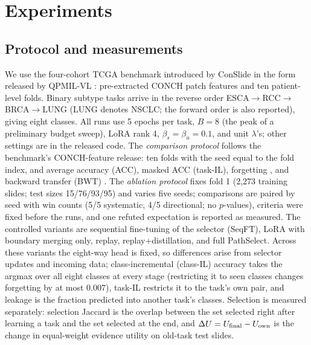 \documentclass{article}
\begin{document}
\section{Experiments}
\label{sec:exp}

\subsection{Protocol and measurements}

We use the four-cohort TCGA benchmark introduced by ConSlide \cite{huang2023conslide} in the form released by QPMIL-VL \cite{gou2025qpmil}: pre-extracted CONCH patch features and ten patient-level folds. Binary subtype tasks arrive in the reverse order ESCA$\rightarrow$RCC$\rightarrow$BRCA$\rightarrow$LUNG (LUNG denotes NSCLC; the forward order is also reported), giving eight classes. All runs use 5 epochs per task, $B=8$ (the peak of a preliminary budget sweep), LoRA rank 4, $\beta_s{=}\beta_u{=}0.1$, and unit $\lambda$'s; other settings are in the released code. The \emph{comparison protocol} follows the benchmark's CONCH-feature release: ten folds with the seed equal to the fold index, and average accuracy (ACC), masked ACC (task-IL), forgetting \cite{chaudhry2018rwalk}, and backward transfer (BWT) \cite{lopezpaz2017gem}. The \emph{ablation protocol} fixes fold 1 (2,273 training slides; test sizes 15/76/93/95) and varies five seeds; comparisons are paired by seed with win counts (5/5 systematic, 4/5 directional; no $p$-values), criteria were fixed before the runs, and one refuted expectation is reported as measured. The controlled variants are sequential fine-tuning of the selector (SeqFT), LoRA with boundary merging only, replay, replay+distillation, and full PathSelect. Across these variants the eight-way head is fixed, so differences arise from selector updates and incoming data; class-incremental (class-IL) accuracy takes the argmax over all eight classes at every stage (restricting it to seen classes changes forgetting by at most $0.007$), task-IL restricts it to the task's own pair, and leakage is the fraction predicted into another task's classes. Selection is measured separately: selection Jaccard is the overlap between the set selected right after learning a task and the set selected at the end, and $\Delta U=U_{\rm final}-U_{\rm own}$ is the change in equal-weight evidence utility on old-task test slides.
\end{document}
